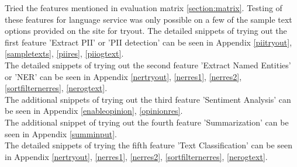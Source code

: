 Tried the features mentioned in evaluation matrix \ref{section:matrix}. Testing of these features for language service was only possible on a few of the sample text options provided on the site for tryout.
The detailed snippets of trying out the first feature 'Extract PII' or '\acs{PII} detection' can be seen in Appendix \ref{piitryout}, \ref{sampletexts}, \ref{piires}, \ref{piiogtext}. \\
The detailed snippets of trying out the second feature 'Extract Named Entities' or '\acs{NER}' can be seen in Appendix \ref{nertryout}, \ref{nerres1}, \ref{nerres2}, \ref{sortfilternerres}, \ref{nerogtext}. \\
The additional snippets of trying out the third feature 'Sentiment Analysis' can be seen in Appendix \ref{enableopinion}, \ref{opinionres}. \\
The additional snippet of trying out the fourth feature 'Summarization' can be seen in Appendix \ref{summinput}. \\
The detailed snippets of trying the fifth feature 'Text Classification' can be seen in Appendix \ref{nertryout}, \ref{nerres1}, \ref{nerres2}, \ref{sortfilternerres}, \ref{nerogtext}.
